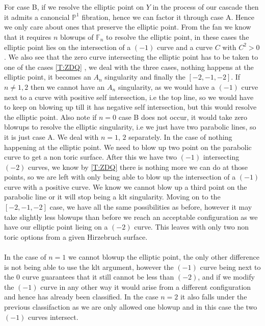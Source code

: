 \documentclass[11pt]{report}
\theoremstyle{definition}
\theoremstyle{definition}
\theoremstyle{definition}
\theoremstyle{definition}
\theoremstyle{definition}
\theoremstyle{definition}
\theoremstyle{definition}
\begin{document}
\\
\\
 For case B, if we resolve the elliptic point on $Y$ in the process of our cascade then it admits a canoncial $\mathbb{P}^1$ fibration, hence we can factor it through case A. Hence we only care about ones that preserve the elliptic point. From the fan we know that it requires $n$ blowups of $\mathbb{F}_n$ to resolve the elliptic point, in these cases the elliptic point lies on the intersection of a $(-1)$ curve and a curve $C$ with $C^2 > 0$. We also see that the zero curve intersecting the elliptic point has to be taken to one of the cases \autoref{T:ZDQ} , we deal with the three cases, nothing happens at the elliptic point, it becomes an $A_n$ singularity and finally the $[ -2, -1, -2]$. If $n \neq 1,2$ then we cannot have an $A_n$ singularity, as we would have a $(-1)$ curve next to a curve with positive self intersection, i.e  the top line, so we would have to keep on blowing up till it has negative self intersection, but this would resolve the elliptic point. Also note if $n=0$ case B does not occur, it would take zero blowups to resolve the elliptic singularity, i.e we just have two parabolic lines, so it is just case A. We deal with $n=1, \, 2$ separately. In the case of nothing happening at the elliptic point. We need to blow up two point on the parabolic curve to get a non toric surface. After this we have two $(-1)$ intersecting $(-2)$ curves, we know by \autoref{T:ZDQ} there is nothing more we can do at those points, so we are left with only being able to blow up the intersection of a $(-1)$ curve with a positive curve. We know we cannot blow up a third point on the parabolic line or it will stop being a klt singularity.  Moving on to the $[-2, -1, -2]$ case, we have all the same possibilities as before, however it may take slightly less blowups than before we reach an acceptable configuration as we have our elliptic point lieing on a $(-2)$ curve. This leaves with only two non toric options from a given Hirzebruch surface.
\\
\\
In the case of $n=1$ we cannot blowup the elliptic point, the only other difference is not being able to use the klt argument, however the $(-1)$ curve being next to the 0 curve guarantees that it still cannot be less than $(-2)$, and if we modify the $(-1)$ curve in any other way it would arise from a different configuration and hence has already been classified. In the case $n = 2$ it also falls under the previous classifaction as we are only allowed one blowup and in this case the two $(-1)$ curves intersect.
\end{document}
